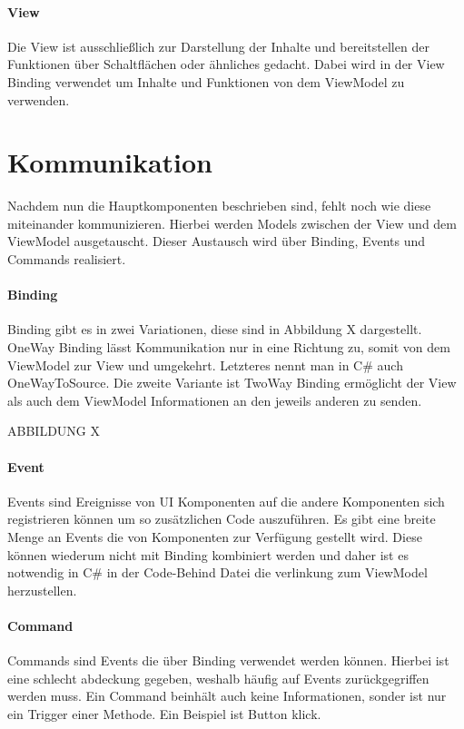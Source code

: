 \documentclass[titlepage=false,12pt]{scrreprt}
\begin{document}
\paragraph{View}

Die View ist ausschließlich zur Darstellung der Inhalte und bereitstellen der
Funktionen über Schaltflächen oder ähnliches gedacht. Dabei wird in der View
Binding verwendet um Inhalte und Funktionen von dem ViewModel zu verwenden.

\section{Kommunikation}

Nachdem nun die Hauptkomponenten beschrieben sind, fehlt noch wie diese miteinander 
kommunizieren. Hierbei werden Models zwischen der View und dem ViewModel ausgetauscht.
Dieser Austausch wird über Binding, Events und Commands realisiert.

\paragraph{Binding}

Binding gibt es in zwei Variationen, diese sind in Abbildung X dargestellt. OneWay Binding
lässt Kommunikation nur in eine Richtung zu, somit von dem ViewModel zur View und umgekehrt.
Letzteres nennt man in C\# auch OneWayToSource. Die zweite Variante ist TwoWay Binding ermöglicht
der View als auch dem ViewModel Informationen an den jeweils anderen zu senden.


ABBILDUNG X

\paragraph{Event}

Events sind Ereignisse von UI Komponenten auf die andere Komponenten sich registrieren 
können um so zusätzlichen Code auszuführen. Es gibt eine breite Menge an Events die
von Komponenten zur Verfügung gestellt wird. Diese können wiederum nicht mit Binding 
kombiniert werden und daher ist es notwendig in C\# in der Code-Behind Datei
die verlinkung zum ViewModel herzustellen.

\paragraph{Command}

Commands sind Events die über Binding verwendet werden können. Hierbei ist eine schlecht
abdeckung gegeben, weshalb häufig auf Events zurückgegriffen werden muss. Ein Command
beinhält auch keine Informationen, sonder ist nur ein Trigger einer Methode. Ein Beispiel
ist Button klick.
\end{document}

